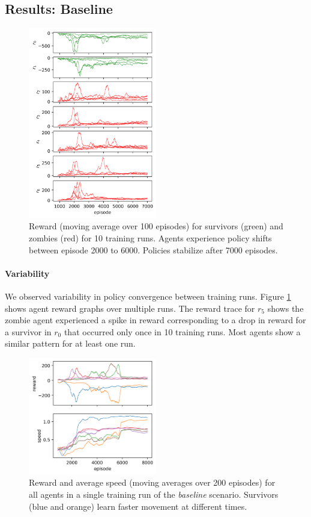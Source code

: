 \documentclass[11pt,a4paper]{article}
\begin{document}
\subsection{Results: Baseline}

\begin{figure}
  \centering
  \includegraphics[width=0.5\textwidth]{figures/baseline_reward.png}
  \caption{
    Reward (moving average over 100 episodes) for survivors (green) and zombies (red) for 10 training runs.
    Agents experience policy shifts between episode 2000 to 6000.
    Policies stabilize after 7000 episodes.
  }
  \label{fig:baseline_reward}
\end{figure}

\paragraph{Variability} We observed variability in policy convergence between training runs.
Figure \ref{fig:baseline_reward} shows agent reward graphs over multiple runs.
The reward trace for $r_5$ shows the zombie agent experienced a spike in reward corresponding to a drop in reward for a survivor in $r_0$
that occurred only once in 10 training runs.
Most agents show a similar pattern for at least one run.

\begin{figure}
  \centering
  \includegraphics[width=0.5\textwidth]{figures/baseline_speed.png}
  \caption{
    Reward and average speed (moving averages over 200 episodes)
    for all agents in a single training run of the \emph{baseline} scenario.
    Survivors (blue and orange) learn faster movement at different times.
  }
  \label{fig:baseline_speed}
\end{figure}
\end{document}
